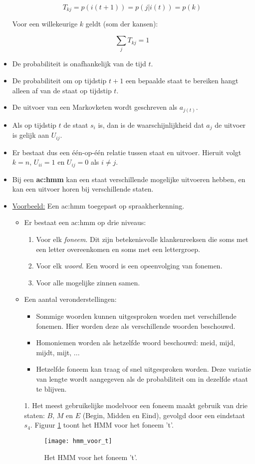 \begin{itemize}
	$$T_{kj} = p(i(t + 1)) = p(j|i(t)) = p(k)$$
	
	Voor een willekeurige $k$ geldt (som der kansen):
	
	$$\sum_j T_{kj} = 1$$
	
	\item De probabiliteit is onafhankelijk van de tijd $t$.
	\item De probabiliteit om op tijdstip $t + 1$ een bepaalde staat te bereiken hangt alleen af van de staat op tijdstip $t$.
	\item De uitvoer van een Markovketen wordt geschreven als $a_{j(t)}$. 
	\item Als op tijdstip $t$ de staat $s_i$ is, dan is de waarschijnlijkheid dat $a_j$ de uitvoer is gelijk aan $U_{ij}$.
	\item Er bestaat dus een één-op-één relatie tussen staat en uitvoer. Hieruit volgt $k = n$, $U_{ii} = 1$ en $U_{ij} = 0$ als $i \neq j$.
	\item Bij een \textbf{\gls{ac:hmm}} kan een staat verschillende mogelijke uitvoeren hebben, en kan een uitvoer horen bij verschillende staten.
	
	\item \underline{Voorbeeld:} Een \gls{ac:hmm} toegepast op spraakherkenning.
	\begin{itemize}
		\item Er bestaat een \gls{ac:hmm} op drie niveaus:
		\begin{enumerate}
			\item Voor elk \textit{foneem}. Dit zijn betekenisvolle klankenreeksen die soms met een letter overeenkomen en soms met een lettergroep.
			\item Voor elk \textit{woord}. Een woord is een opeenvolging van fonemen. 
			\item Voor alle mogelijke zinnen samen.
		\end{enumerate}
		\item Een aantal veronderstellingen:
		\begin{itemize}
			\item Sommige woorden kunnen uitgesproken worden met verschillende fonemen. Hier worden deze als verschillende woorden beschouwd.
			\item Homoniemen worden als hetzelfde woord beschouwd: meid, mijd, mijdt, mijt, ...
			\item Hetzelfde foneem kan traag of snel uitgesproken worden. Deze variatie van lengte wordt aangegeven als de probabiliteit om in dezelfde staat te blijven.
		\end{itemize}
		\item[1. ] Het meest gebruikelijke modelvoor een foneem  maakt gebruik van drie staten: $B$, $M$ en $E$ (Begin, Midden en Eind), gevolgd door een eindstaat $s_4$. Figuur \ref{fig:hmm_voor_t} toont het HMM voor het foneem 't'.
		\begin{figure}
			\texttt{[image: hmm\_voor\_t]}
			\caption{Het HMM voor het foneem 't'.}
			\label{fig:hmm_voor_t}
		\end{figure}
	

\end{itemize}
\end{itemize}
